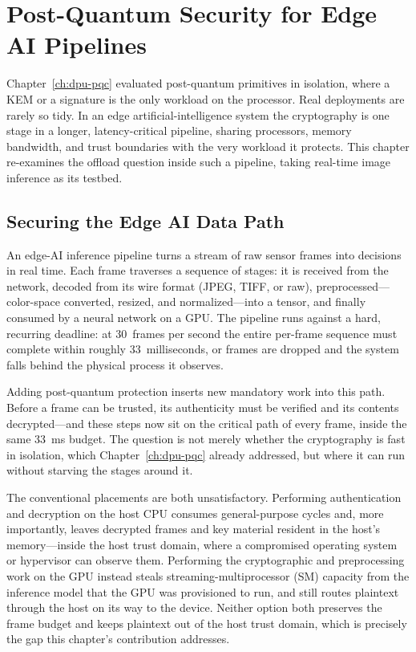 \chapter{Post-Quantum Security for Edge AI Pipelines}
\label{ch:edge-ai}

Chapter~\ref{ch:dpu-pqc} evaluated post-quantum primitives in isolation, where a KEM or a signature is the only workload on the processor. Real deployments are rarely so tidy. In an edge artificial-intelligence system the cryptography is one stage in a longer, latency-critical pipeline, sharing processors, memory bandwidth, and trust boundaries with the very workload it protects. This chapter re-examines the offload question inside such a pipeline, taking real-time image inference as its testbed.

\section{Securing the Edge AI Data Path}
\label{sec:edge-datapath}

An edge-AI inference pipeline turns a stream of raw sensor frames into decisions in real time. Each frame traverses a sequence of stages: it is received from the network, decoded from its wire format (JPEG, TIFF, or raw), preprocessed---color-space converted, resized, and normalized---into a tensor, and finally consumed by a neural network on a GPU. The pipeline runs against a hard, recurring deadline: at 30~frames per second the entire per-frame sequence must complete within roughly 33~milliseconds, or frames are dropped and the system falls behind the physical process it observes.

Adding post-quantum protection inserts new mandatory work into this path. Before a frame can be trusted, its authenticity must be verified and its contents decrypted---and these steps now sit on the critical path of every frame, inside the same 33~ms budget. The question is not merely whether the cryptography is fast in isolation, which Chapter~\ref{ch:dpu-pqc} already addressed, but where it can run without starving the stages around it.

The conventional placements are both unsatisfactory. Performing authentication and decryption on the host CPU consumes general-purpose cycles and, more importantly, leaves decrypted frames and key material resident in the host's memory---inside the host trust domain, where a compromised operating system or hypervisor can observe them. Performing the cryptographic and preprocessing work on the GPU instead steals streaming-multiprocessor (SM) capacity from the inference model that the GPU was provisioned to run, and still routes plaintext through the host on its way to the device. Neither option both preserves the frame budget and keeps plaintext out of the host trust domain, which is precisely the gap this chapter's contribution addresses.

